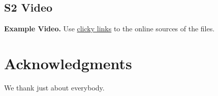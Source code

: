 \documentclass[10pt,letterpaper]{article}
\begin{document}
\subsection*{S2 Video}
\label{example_video}
{\bf Example Video.} Use \href{www.youtube.com}{clicky links} to the online sources of the files.


\section*{Acknowledgments}
We thank just about everybody.

\nolinenumbers




\end{document}
